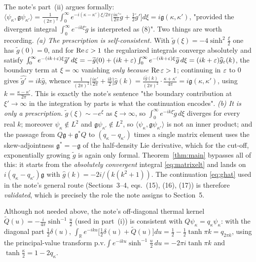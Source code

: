 \documentclass[11pt]{article}
\newcommand{\gt}{\widetilde g}\newcommand{\gh}{\widehat g}\newcommand{\Wh}{\widehat W}
\newcommand{\gfr}{\mathfrak g}\newcommand{\Dt}{\widetilde D^{(1)}}\newcommand{\psih}{\psi}
\begin{document}
\begin{remark}\label{rem:continuation}
The note's part~(ii) argues formally:
\(\langle\psih_\kappa,\gfr\psih_{\kappa'}\rangle
=\frac1{(2\pi)^2}\int_0^\infty e^{-i(\kappa-\kappa')\xi/2\pi}\bigl[\frac{i\kappa'}{2\pi}\gt
+\frac12\gt'\bigr]d\xi=i\gfr(\kappa,\kappa')\),
"provided the divergent integral \(\int_0^\infty e^{-ik\xi}\gt\) is interpreted as (8)".  Two
things are worth recording.
\emph{(a) The prescription is self-consistent.}  With \(\gt(\xi)=-4\sinh^2\frac\xi2\) one has
\(\gt(0)=0\), and for \(\operatorname{Re}\varepsilon>1\) the regularized integrals converge absolutely and
satisfy \(\int_0^\infty e^{-(ik+\eps)\xi}\gt'\,d\xi=-\gt(0)+(ik+\eps)\int_0^\infty
e^{-(ik+\eps)\xi}\gt\,d\xi=(ik+\eps)\gh_\eps(k)\), the boundary term at \(\xi=\infty\) vanishing
\emph{only because} \(\operatorname{Re}\varepsilon>1\); continuing in \(\varepsilon\) to \(0\) gives
\(\widehat{\gt'}=ik\gh\), whence
\(\frac1{(2\pi)^2}\bigl[\frac{i\kappa'}{2\pi}+\frac{ik}2\bigr]\gh(k)
=\frac{i\gh(k)}{(2\pi)^2}\cdot\frac{\kappa+\kappa'}{4\pi}=i\gfr(\kappa,\kappa')\), using
\(k=\frac{\kappa-\kappa'}{2\pi}\).  This is exactly the note's sentence "the boundary contribution
at \(\xi'\to\infty\) in the integration by parts is what the continuation encodes".
\emph{(b) It is only a prescription.}  \(\gt(\xi)\sim-e^{\xi}\) as \(\xi\to\infty\), so
\(\int_0^\infty e^{-ik\xi}\gt\,d\xi\) diverges for every real \(k\); moreover \(\psih_\kappa\notin
L^2\) and \(\gfr\psih_{\kappa'}\notin L^2\), so \(\langle\psih_\kappa,\gfr\psih_{\kappa'}\rangle\) is
not an inner product; and the passage from \(Q\gfr+\gfr^*Q\) to \((q_\kappa-q_{\kappa'})\) times a
single matrix element uses the skew-adjointness \(\gfr^*=-\gfr\) of the half-density Lie derivative,
which for the cut-off, exponentially growing \(\gt\) is again only formal.  Theorem~\ref{thm:main}
bypasses all of this: it starts from the \emph{absolutely convergent} integral \eqref{eq:matrixelt}
and lands on \(i(q_\kappa-q_{\kappa'})\gfr\) with \(\gh(k)=-2i/(k(k^2+1))\).  The continuation
\eqref{eq:ghat} used in the note's general route (Sections~3--4, eqs.~(15), (16),
(17)) is therefore \emph{validated}, which is precisely the role the note assigns to
Section~5.
\end{remark}

\begin{remark}\label{rem:Q}
Although not needed above, the note's off-diagonal thermal kernel
\(\widetilde Q(u)=-\frac i{4\pi}\sinh^{-1}\frac u2\) (used in part~(i)) is consistent with
\(Q\psih_\kappa=q_\kappa\psih_\kappa\): with the diagonal part \(\frac12\delta(u)\),
\(\int_{\mathbb R}e^{-iku}\bigl[\tfrac12\delta(u)+\widetilde Q(u)\bigr]du
=\tfrac12-\tfrac12\tanh\pi k=q_{2\pi k}\), using the principal-value transform
\(\mathrm{p.v.}\!\int e^{-iku}\sinh^{-1}\frac u2\,du=-2\pi i\tanh\pi k\) and
\(\tanh\frac\kappa2=1-2q_\kappa\).
\end{remark}
\end{document}
